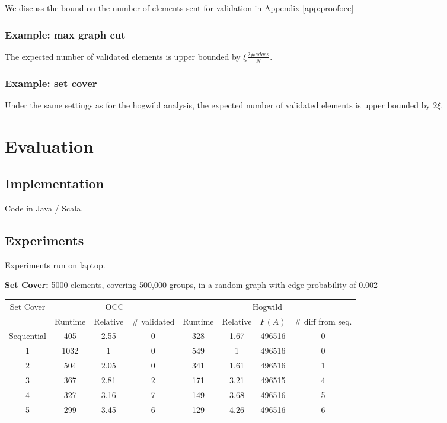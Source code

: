 \documentclass{article} %
\begin{document}
We discuss the bound on the number of elements sent for validation in Appendix \ref{app:proofocc}

\subsubsection{Example: max graph cut}
The expected number of validated elements is upper bounded by $\xi \frac{2\#edges}{N}$.

\subsubsection{Example: set cover}
Under the same settings as for the hogwild analysis, the expected number of validated elements is upper bounded by $2\xi$.

















\section{Evaluation}

\subsection{Implementation}
Code in Java / Scala.

\subsection{Experiments}
Experiments run on laptop.

\textbf{Set Cover:} 5000 elements, covering 500,000 groups, in a random graph with edge probability of 0.002

\begin{tabular}{|c|c|c|c|c|c|c|c|}
\hline
\multirow{2}{*}{Set Cover} & \multicolumn{3}{c|}{OCC} & \multicolumn{4}{c|}{Hogwild}\\
 & Runtime & Relative & \# validated & Runtime & Relative & $F(A)$ & \# diff from seq.\\\hline
Sequential &	 405 &	 2.55 &	 0 &	 328 &	 1.67 &	 496516 &	 0\\\hline
1&	 1032&	 1&	 0&	 549&	 1&	 496516&	 0\\\hline
2&	 504&	 2.05&	 0&	 341&	 1.61&	 496516&	 1\\\hline
3&	 367&	 2.81&	 2&	 171&	 3.21&	 496515&	 4\\\hline
4&	 327&	 3.16&	 7&	 149&	 3.68&	 496516&	 5\\\hline
5&	 299&	 3.45&	 6&	 129&	 4.26&	 496516&	 6\\\hline
\end{tabular}
\end{document}

